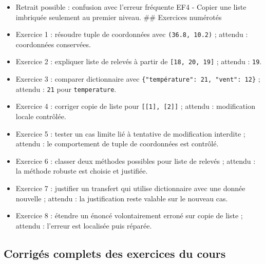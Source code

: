 \begin{itemize}
  pourquoi il ne s'applique pas.
\item
  Retrait possible : confusion avec l'erreur fréquente EF4 - Copier une
  liste imbriquée seulement au premier niveau. \#\# Exercices numérotés
\item
  Exercice 1 : résoudre tuple de coordonnées avec \texttt{(36.8,\ 10.2)}
  ; attendu : coordonnées conservées.
\item
  Exercice 2 : expliquer liste de relevés à partir de
  \texttt{{[}18,\ 20,\ 19{]}} ; attendu : \texttt{19}.
\item
  Exercice 3 : comparer dictionnaire avec
  \texttt{\{"température":\ 21,\ "vent":\ 12\}} ; attendu : \texttt{21}
  pour \texttt{temperature}.
\item
  Exercice 4 : corriger copie de liste pour
  \texttt{{[}{[}1{]},\ {[}2{]}{]}} ; attendu : modification locale
  contrôlée.
\item
  Exercice 5 : tester un cas limite lié à tentative de modification
  interdite ; attendu : le comportement de tuple de coordonnées est
  contrôlé.
\item
  Exercice 6 : classer deux méthodes possibles pour liste de relevés ;
  attendu : la méthode robuste est choisie et justifiée.
\item
  Exercice 7 : justifier un transfert qui utilise dictionnaire avec une
  donnée nouvelle ; attendu : la justification reste valable sur le
  nouveau cas.
\item
  Exercice 8 : étendre un énoncé volontairement erroné sur copie de
  liste ; attendu : l'erreur est localisée puis réparée.
\end{itemize}

\subsection{Corrigés complets des exercices du cours}

